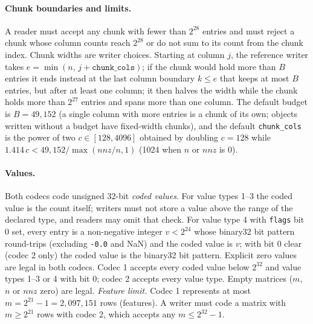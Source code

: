 \paragraph{Chunk boundaries and limits.}
A reader must accept any chunk with fewer than $2^{28}$ entries and must reject a chunk whose column counts reach
$2^{28}$ or do not sum to its count from the chunk index. Chunk widths are writer choices.
Starting at column $j$, the reference writer takes $e=\min(n,\,j+\texttt{chunk\_cols})$; if the
chunk would hold more than $B$ entries it ends instead at the last column boundary $k\le e$ that keeps at most $B$
entries, but after at least one column; it then halves the width while the chunk holds more than $2^{27}$ entries and
spans more than one column. The default budget is $B=49{,}152$ (a single column with more entries is a chunk of its own;
objects written without a budget have fixed-width chunks), and the default \texttt{chunk\_cols} is the power of two
$c\in[128,4096]$ obtained by doubling $c=128$ while $1.414\,c<49{,}152/\max(\mathit{nnz}/n,1)$ (1024 when $n$ or
$\mathit{nnz}$ is 0).

\paragraph{Values.}
\label{spec:values}
Both codecs code unsigned 32-bit \emph{coded values}. For value types 1--3 the coded value is the count itself;
writers must not store a value above the range of the declared type, and readers may omit that check. For value type 4
with \texttt{flags} bit 0 set, every entry is a non-negative integer $v<2^{24}$ whose binary32 bit pattern round-trips
(excluding \texttt{-0.0} and NaN) and the coded value is $v$; with bit 0 clear (codec 2 only) the coded value is the
binary32 bit pattern. Explicit zero values are legal in both codecs. Codec 1 accepts every coded value below $2^{32}$
and value types 1--3 or 4 with bit 0; codec 2 accepts every value type. Empty matrices ($m$, $n$ or $\mathit{nnz}$ zero)
are legal.
\emph{Feature limit.} Codec 1 represents at most $m=2^{21}-1=2{,}097{,}151$ rows (features). A writer must code a matrix
with $m\ge 2^{21}$ rows with codec 2, which accepts any $m\le 2^{32}-1$.

